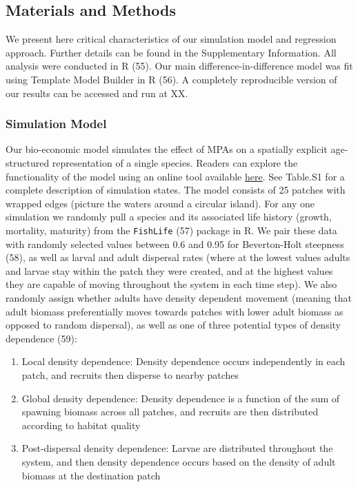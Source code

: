 \documentclass[9pt,twocolumn,twoside,lineno]{pnas-new}
\begin{document}
\hypertarget{materials-and-methods}{%
\subsection{Materials and Methods}\label{materials-and-methods}}

We present here critical characteristics of our simulation model and
regression approach. Further details can be found in the Supplementary
Information. All analysis were conducted in R (55). Our main
difference-in-difference model was fit using Template Model Builder in R
(56). A completely reproducible version of our results can be accessed
and run at XX.

\hypertarget{simulation-model}{%
\subsubsection{Simulation Model}\label{simulation-model}}

Our bio-economic model simulates the effect of MPAs on a spatially
explicit age-structured representation of a single species. Readers can
explore the functionality of the model using an online tool available
\href{https://danovando.shinyapps.io/simmpa/}{here}. See Table.S1 for a
complete description of simulation states. The model consists of 25
patches with wrapped edges (picture the waters around a circular
island). For any one simulation we randomly pull a species and its
associated life history (growth, mortality, maturity) from the
\texttt{FishLife} (57) package in R. We pair these data with randomly
selected values between 0.6 and 0.95 for Beverton-Holt steepness (58),
as well as larval and adult dispersal rates (where at the lowest values
adults and larvae stay within the patch they were created, and at the
highest values they are capable of moving throughout the system in each
time step). We also randomly assign whether adults have density
dependent movement (meaning that adult biomass preferentially moves
towards patches with lower adult biomass as opposed to random
dispersal), as well as one of three potential types of density
dependence (59):

\begin{enumerate}
\def\labelenumi{\arabic{enumi}.}
\item
  Local density dependence: Density dependence occurs independently in
  each patch, and recruits then disperse to nearby patches
\item
  Global density dependence: Density dependence is a function of the sum
  of spawning biomass across all patches, and recruits are then
  distributed according to habitat quality
\item
  Post-dispersal density dependence: Larvae are distributed throughout
  the system, and then density dependence occurs based on the density of
  adult biomass at the destination patch
\end{enumerate}
\end{document}

